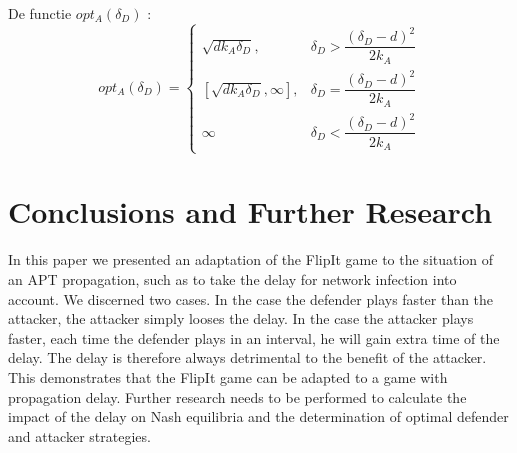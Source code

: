 \documentclass[master=cws, masteroption=vs,english]{kulemt}
\begin{document}
\begin{abstract*}
De functie $opt_{A}(\delta_{D})$ :
 \begin{displaymath}
  opt_{A}(\delta_{D}) = \left\{
     \begin{array}{lr}
       \sqrt{d k_{A}\delta_{D}}, & \delta_{D} > \dfrac{(\delta_{D}-d)^{2}}{2k_{A}}\\
       \left[ \sqrt{d k_{A}\delta_{D}}, \infty\right],  & \delta_{D} = \dfrac{(\delta_{D}-d)^{2}}{2k_{A}} \\
       \infty & \delta_{D} < \dfrac{(\delta_{D}-d)^{2}}{2k_{A}}
     \end{array}
   \right.
\end{displaymath} 
\section{Conclusions and Further Research}
\label{ch:conclusion}
In this paper we presented an adaptation of the FlipIt game to the situation of an APT propagation, such as to take the delay for network infection into account. We discerned two cases. In the case the defender plays faster than the attacker, the attacker simply looses the delay. In the case the attacker plays faster, each time the defender plays in an interval, he will gain extra time of the delay. The delay is therefore always detrimental to the benefit of the attacker. 
This demonstrates that the FlipIt game can be adapted to a game with propagation delay. Further research needs to be performed to calculate the impact of the delay on Nash equilibria and the determination of optimal defender and attacker strategies.
%  
\end{abstract*}
\end{document}
